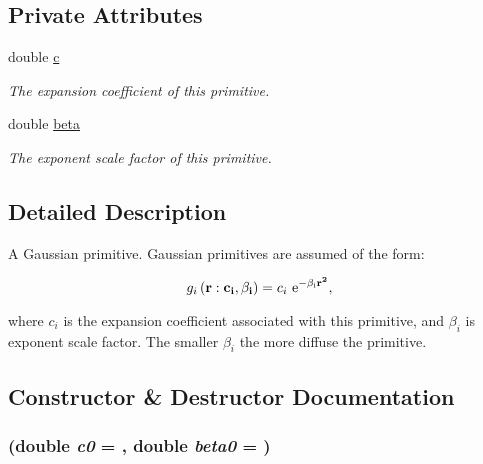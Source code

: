 \subsection*{Private Attributes}
\begin{DoxyCompactItemize}
\item 
double \hyperlink{classJKBuilder_1_1Primitive_a2c09e929a6ea340fc9653cca414b11d3}{c}
\begin{DoxyCompactList}\small\item\em The expansion coefficient of this primitive. \item\end{DoxyCompactList}\item 
double \hyperlink{classJKBuilder_1_1Primitive_a9424343761f8c4f4c1afe8f5b6bf471b}{beta}
\begin{DoxyCompactList}\small\item\em The exponent scale factor of this primitive. \item\end{DoxyCompactList}\end{DoxyCompactItemize}


\subsection{Detailed Description}
A Gaussian primitive. Gaussian primitives are assumed of the form:

\[ g_i\left(\bf{r}:c_i,\beta_i\right)=c_i\ \rm{e}^{-\beta_i\bf{r}^2}, \]

where $c_i$ is the expansion coefficient associated with this primitive, and $\beta_i$ is exponent scale factor. The smaller $\beta_i$ the more diffuse the primitive. 

\subsection{Constructor \& Destructor Documentation}
\hypertarget{classJKBuilder_1_1Primitive_ad5c80a16eab14367b76a4dc79844d0d5}{
\subsubsection[{Primitive}]{ (double {\em c0} = {}, \/  double {\em beta0} = {})}}
\label{classJKBuilder_1_1Primitive_ad5c80a16eab14367b76a4dc79844d0d5}


